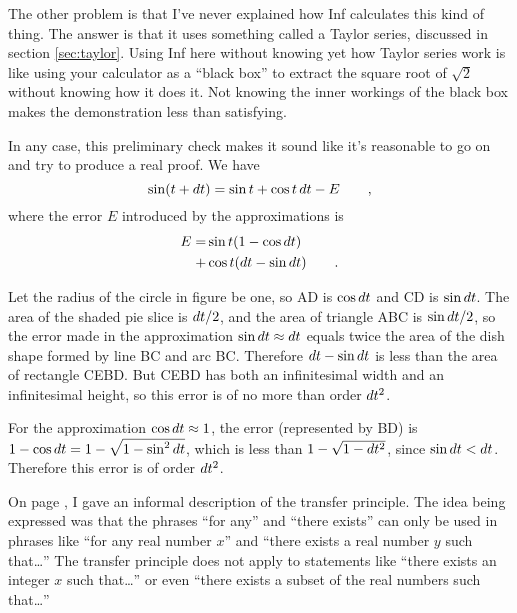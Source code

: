 The other problem is that I've never explained how Inf calculates this kind of thing.
The answer is that it uses something called
a Taylor series, discussed in section \ref{sec:taylor}. Using Inf here without knowing yet how Taylor series
work is like using your calculator as a ``black box'' to extract the square root of $\sqrt{2}$ without knowing how
it does it. Not knowing the inner workings of the black box makes the demonstration less than satisfying.

In any case, this preliminary check makes it sound like it's reasonable to go on and try to produce a
real proof. We have
\begin{equation*}
  \sin(t+\mathop{d\!} t) = \sin t + \cos t \mathop{d\!} t - E \qquad ,
\end{equation*}
where the error $E$ introduced by the approximations is
\begin{align*}
  E = &\sin t (1-\cos \mathop{d\!} t) \\
    + &\cos t (\mathop{d\!} t - \sin \mathop{d\!} t) \qquad .
\end{align*}

Let the radius of the circle in figure  be one, so AD
is $\cos \mathop{d\!} t$ and CD is $\sin \mathop{d\!} t$. The area of the shaded pie slice
is $\mathop{d\!} t/2$, and the area of triangle ABC is $\sin\mathop{d\!} t/2$, so the
error made in the approximation $\sin\mathop{d\!} t\approx\mathop{d\!} t$ equals twice
the area of the dish shape formed by line BC and arc BC. Therefore
$\mathop{d\!} t-\sin\mathop{d\!} t$ is less than the area of rectangle CEBD.
But CEBD has both an infinitesimal width and an infinitesimal height,
so this error is of no more than order $\mathop{d\!} t^2$.

For the approximation $\cos\mathop{d\!} t\approx 1$, the error (represented
by BD) is $1-\cos\mathop{d\!} t=1-\sqrt{1-\sin^2\mathop{d\!} t}$, which is less
than $1-\sqrt{1-\mathop{d\!} t^2}$, since $\sin \mathop{d\!} t<\mathop{d\!} t$. Therefore
this error is of order $\mathop{d\!} t^2$.

\label{transfer}
On page \pageref{backref-transfer}, I gave an informal description of the transfer principle.
The idea being expressed was that the phrases ``for any'' and
``there exists'' can only be used in phrases like ``for any real number $x$'' and ``there exists
a real number $y$ such that\ldots'' The transfer principle does not apply to statements like ``there exists
an integer $x$ such that\ldots'' or even ``there exists a subset of the real numbers such that\ldots''

